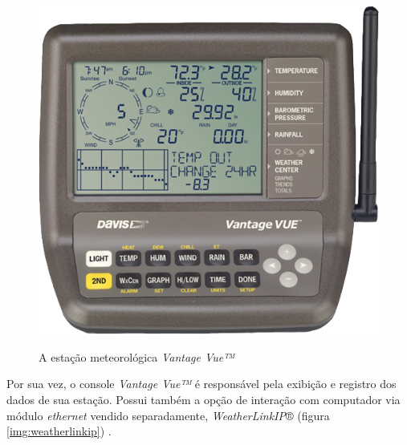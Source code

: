 \begin{figure}[!htb]
\centering
    \caption{\label{img:estacao} A estação meteorológica \textit{Vantage Vue™}}
    \qquad
{\includegraphics[scale=.21]{img/console}}
\label{fig:dag}
\end{figure}

Por sua vez, o console \textit{Vantage Vue™} é responsável pela exibição e registro dos dados de sua estação. Possui também a opção de interação com computador via módulo \textit{ethernet} vendido separadamente, \textit{WeatherLinkIP}® (figura \ref{img:weatherlinkip}) \cite{SITEDAVIS, VVCINSTMANUAL}.

